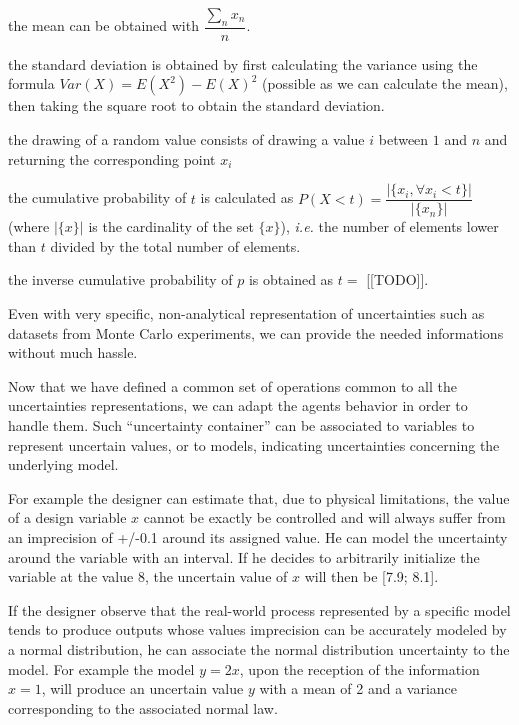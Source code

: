 \begin{compactitem}
\item the mean can be obtained with $\dfrac{\displaystyle\sum_n{x_n}}{n}$.
\item the standard deviation is obtained by first calculating the variance using the formula $Var(X) = E(X^2) - E(X)^2$ (possible as we can calculate the mean), then taking the square root to obtain the standard deviation.
\item the drawing of a random value consists of drawing a value $i$ between $1$ and $n$ and returning the corresponding point $x_i$
\item the cumulative probability of $t$ is calculated as $P(X < t) = \dfrac{|\{x_i, \forall x_i < t\}|}{|\{x_n\}|}$ (where $|\{x\}|$ is the cardinality of the set $\{x\}$), \emph{i.e.} the number of elements lower than $t$ divided by the total number of elements.
\item the inverse cumulative probability of $p$ is obtained as $ t = $ [[TODO]].
\end{compactitem}

Even with very specific, non-analytical representation of uncertainties such as datasets from Monte Carlo experiments, we can provide the needed informations without much hassle.

Now that we have defined a common set of operations common to all the uncertainties representations, we can adapt the agents behavior in order to handle them. Such \enquote{uncertainty container} can be associated to variables to represent uncertain values, or to models, indicating uncertainties concerning the underlying model.

For example the designer can estimate that, due to physical limitations, the value of a design variable $x$ cannot be exactly be controlled and will always suffer from an imprecision of +/-0.1 around its assigned value. He can model the uncertainty around the variable with an interval. If he decides to arbitrarily initialize the variable at the value 8, the uncertain value of $x$ will then be [7.9; 8.1].

If the designer observe that the real-world process represented by a specific model tends to produce outputs whose values imprecision can be accurately modeled by a normal distribution, he can associate the normal distribution uncertainty to the model. For example the model $y = 2x$, upon the reception of the information $x = 1$, will produce an uncertain value $y$ with a mean of 2 and a variance corresponding to the associated normal law.

